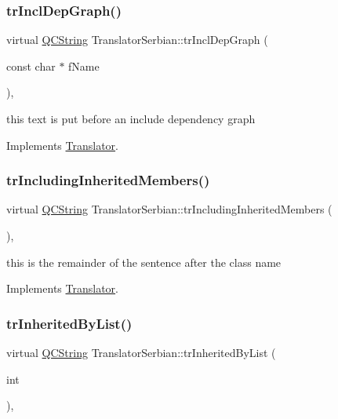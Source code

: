 \subsubsection{\texorpdfstring{trInclDepGraph()}{trInclDepGraph()}}
{\footnotesize\ttfamily virtual \mbox{\hyperlink{class_q_c_string}{Q\+C\+String}} Translator\+Serbian\+::tr\+Incl\+Dep\+Graph (\begin{DoxyParamCaption}\item[{const char $\ast$}]{f\+Name }\end{DoxyParamCaption})\hspace{0.3cm}{\ttfamily [inline]}, {\ttfamily [virtual]}}

this text is put before an include dependency graph 

Implements \mbox{\hyperlink{class_translator}{Translator}}.

\mbox{\label{class_translator_serbian_af8ae5e3f028c399c24891059f6748656}} 
\subsubsection{\texorpdfstring{trIncludingInheritedMembers()}{trIncludingInheritedMembers()}}
{\footnotesize\ttfamily virtual \mbox{\hyperlink{class_q_c_string}{Q\+C\+String}} Translator\+Serbian\+::tr\+Including\+Inherited\+Members (\begin{DoxyParamCaption}{ }\end{DoxyParamCaption})\hspace{0.3cm}{\ttfamily [inline]}, {\ttfamily [virtual]}}

this is the remainder of the sentence after the class name 

Implements \mbox{\hyperlink{class_translator}{Translator}}.

\mbox{\label{class_translator_serbian_ad909c2cc73e8ed088f9b37a3567f5ef6}} 
\subsubsection{\texorpdfstring{trInheritedByList()}{trInheritedByList()}}
{\footnotesize\ttfamily virtual \mbox{\hyperlink{class_q_c_string}{Q\+C\+String}} Translator\+Serbian\+::tr\+Inherited\+By\+List (\begin{DoxyParamCaption}\item[{int}]{ }\end{DoxyParamCaption})\hspace{0.3cm}{\ttfamily [inline]}, {\ttfamily [virtual]}}

